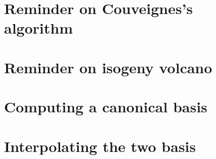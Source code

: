 \documentclass[10pt,a4paper]{article}
\author{Luca DeFeo,Cyril Hugounenq,Jérôme Plût, Eric Schost}
\theoremstyle{plain}
\theoremstyle{definition}
\theoremstyle{definition}
\theoremstyle{definition}
\theoremstyle{definition}
\theoremstyle{remark}
\theoremstyle{remark}
\begin{document}
\section{Reminder on Couveignes's algorithm}


\section{Reminder on isogeny volcano}

\section{Computing a canonical basis}

\section{Interpolating the two basis}
\end{document}
